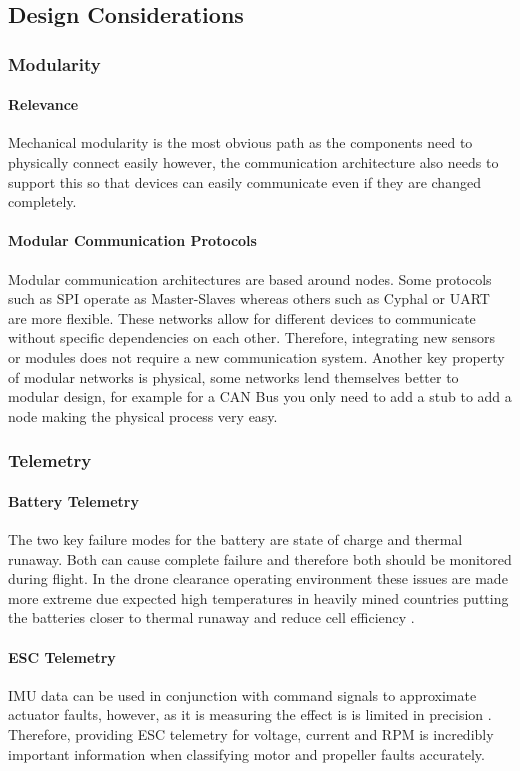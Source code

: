 \subsection{Design Considerations}

\subsubsection{Modularity}
\paragraph{Relevance}
Mechanical modularity is the most obvious path as the components need to physically connect easily however, the communication architecture also needs to support this so that devices can easily communicate even if they are changed completely.
\paragraph{Modular Communication Protocols}
Modular communication architectures are based around nodes. Some protocols such as \gls{SPI} operate as Master-Slaves whereas others such as Cyphal or \gls{UART} are more flexible. These networks allow for different devices to communicate without specific dependencies on each other. Therefore, integrating new sensors or modules does not require a new communication system. Another key property of modular networks is physical, some networks lend themselves better to modular design, for example for a \gls{CAN} Bus you only need to add a stub to add a node making the physical process very easy.

\subsubsection{Telemetry}
\paragraph{Battery Telemetry}
The two key failure modes for the battery are state of charge and thermal runaway. Both can cause complete failure and therefore both should be monitored during flight. In the drone clearance operating environment these issues are made more extreme due expected high temperatures in heavily mined countries putting the batteries closer to thermal runaway and reduce cell efficiency \cite{REF}.
\paragraph{\gls{ESC} Telemetry}
\gls{IMU} data can be used in conjunction with command signals to approximate actuator faults, however, as it is measuring the effect is is limited in precision \cite{REF}. Therefore, providing \gls{ESC} telemetry for voltage, current and \gls{RPM} is incredibly important information when classifying motor and propeller faults accurately.   

